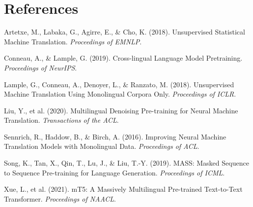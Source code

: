 \documentclass[11pt]{article}
\begin{document}
\section*{References}

Artetxe, M., Labaka, G., Agirre, E., \& Cho, K. (2018). Unsupervised Statistical Machine Translation. \textit{Proceedings of EMNLP}.

Conneau, A., \& Lample, G. (2019). Cross-lingual Language Model Pretraining. \textit{Proceedings of NeurIPS}.

Lample, G., Conneau, A., Denoyer, L., \& Ranzato, M. (2018). Unsupervised Machine Translation Using Monolingual Corpora Only. \textit{Proceedings of ICLR}.

Liu, Y., et al. (2020). Multilingual Denoising Pre-training for Neural Machine Translation. \textit{Transactions of the ACL}.

Sennrich, R., Haddow, B., \& Birch, A. (2016). Improving Neural Machine Translation Models with Monolingual Data. \textit{Proceedings of ACL}.

Song, K., Tan, X., Qin, T., Lu, J., \& Liu, T.-Y. (2019). MASS: Masked Sequence to Sequence Pre-training for Language Generation. \textit{Proceedings of ICML}.

Xue, L., et al. (2021). mT5: A Massively Multilingual Pre-trained Text-to-Text Transformer. \textit{Proceedings of NAACL}.
\end{document}
